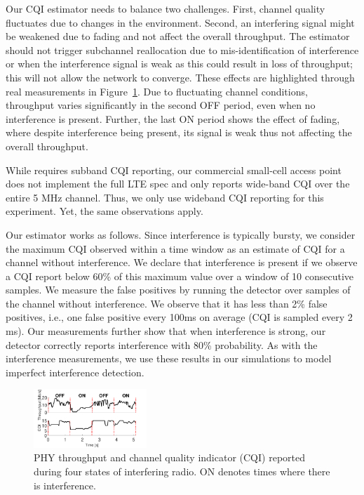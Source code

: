 Our CQI estimator needs to balance two challenges. First, channel quality fluctuates due to changes in the environment.
Second, an interfering signal might be weakened due to fading and not affect the overall throughput. 
The estimator should not trigger subchannel reallocation due to mis-identification of interference or when 
the interference signal is weak as this could result in loss of throughput; this will not allow the network to converge. 
These effects are highlighted through real measurements in Figure~\ref{fig:interf_control_time}. 
Due to fluctuating channel conditions, throughput varies significantly in the second OFF period, even when no interference is present.
Further, the last ON period shows the effect of fading, where despite interference being present, its signal is weak thus not affecting the overall throughput.

While \cf requires subband CQI reporting, our commercial small-cell access point does not implement the full LTE spec 
and only reports wide-band CQI over the entire 5 MHz channel. Thus, we only use wideband CQI reporting for this experiment. 
Yet, the same observations apply.

Our estimator works as follows. Since interference is typically bursty, we consider the maximum CQI observed within a time window as an estimate of CQI for a channel without interference. 
We declare that interference is present if we observe a CQI report below 60\% of this maximum value over a window of 10 consecutive samples. 
We measure the false positives by running the detector over samples of the channel without interference. 
We observe that it has less than 2\% false positives, i.e., one false positive every 100ms on average
(CQI is sampled every 2 ms). 
Our measurements further show that when interference is strong, our detector correctly reports interference with 80\% probability.
As with the interference measurements, we use these results in our simulations to model imperfect interference detection. 


\begin{figure}[t]
\vspace{-10pt}
  \centering
    \includegraphics[width=0.38\textwidth]{./figs/cqi_time.pdf}
    \vspace{-0.15in}
  \caption{\small{PHY throughput and channel quality indicator (CQI) reported during four states of interfering radio. 
ON denotes times where there is interference. }}
\vspace{-0.22in}

  \label{fig:interf_control_time}
\end{figure}

